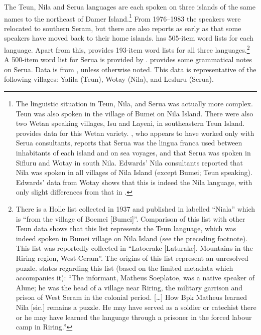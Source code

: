 \largerpage
The Teun, Nila and Serua languages are each spoken on three islands
of the same names to the northeast of Damer Island.\footnote{
		The linguistic situation in Teun,
		Nila, and Serua was actually more complex.
		Teun was also spoken in the village of Bumei on Nila Island.
		There were also two Wetan speaking villages,
		Isu and Layeni, in southeastern Teun Island.
		\citet{Chlenova2006} provides data for this Wetan variety.
		\citet[52, 78]{vanEngelenhoven2003}, who appears to have worked
		only with Serua consultants,
		reports that Serua was the lingua franca used between inhabitants
		of each island and on sea voyages,
		and that Serua was spoken in Sifluru
		and Wotay in south Nila.
		Edwards’ Nila consultants reported that Nila was spoken in all
		villages of Nila Island (except Bumei; Teun speaking).
		Edwards’ data from Wotay shows that this is indeed the Nila language,
		with only slight differences from that in \citet{Taber1993}.}
From 1976--1983 the speakers were relocated to southern Seram,
but there are also reports as early as \citet[404]{Taber1993}
that some speakers have moved back to their home islands.
\citet{Edwards2023} has 505-item word lists for each language.
Apart from this, \citet{Taber1993} provides 193-item word lists
for all three languages.\footnote{
		There is a Holle list collected
		in 1937 and published in \citet[161--174]{Stokhof1981b} labelled “Niala”
		which is “from the village of Boemei [Bumei]”.
		Comparison of this list with other Teun data shows that this
		list represents the Teun language,
		which was indeed spoken in Bumei village on Nila Island (see the preceding footnote).
		This list was reportedly collected in “Latoerake [Laturake],
		Mountains in the Riring region, West-Ceram”.
		The origins of this list represent an unresolved puzzle.
		\citet[197]{Collins1982d} states regarding this list (based on
		the limited metadata which accompanies it): “The informant,
		Matheus Soeplatoe, was a native speaker of Alune; he was the
		head of a village near Riring,
		the military garrison and prison of West Seram in the colonial period.
		[{\ldots}] How Bpk Matheus learned Nila [sic.] remains a puzzle.
		He may have served as a soldier or catechist there or he may
		have learned the language through a prisoner in the forced labour
		camp in Riring.”}
A 500-item word list for Serua is provided by \citet{Chlenova2004}.
\citet{vanEngelenhoven2003} provides some grammatical notes on Serua.
Data is from \citet{Edwards2023}, unless otherwise noted.
This data is representative of the following villages: Yafila
(Teun), Wotay (Nila), and Lesluru (Serua).

